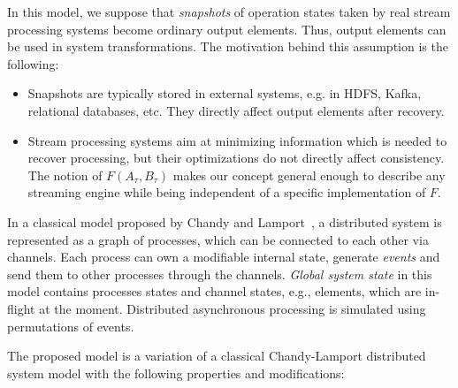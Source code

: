 In this model, we suppose that {\em snapshots} of operation states taken by real stream processing systems become ordinary output elements. Thus, output elements can be used in system transformations. The motivation behind this assumption is the following:

\begin{itemize}
    \item Snapshots are typically stored in external systems, e.g. in HDFS, Kafka, relational databases, etc. They directly affect output elements after recovery.
    \item Stream processing systems aim at minimizing information which is needed to recover processing, but their optimizations do not directly affect consistency. The notion of $F(A_\tau,B_\tau)$ makes our concept general enough to describe any streaming engine while being independent of a specific implementation of $F$.
\end{itemize}

In a classical model proposed by Chandy and Lamport~\cite{Chandy:1985:DSD:214451.214456}, a distributed system is represented as a graph of processes, which can be connected to each other via channels. Each process can own a modifiable internal state, generate {\em events} and send them to other processes through the channels. {\em Global system state} in this model contains processes states and channel states, e.g., elements, which are in-flight at the moment. Distributed asynchronous processing is simulated using permutations of events.

The proposed model is a variation of a classical Chandy-Lamport distributed system model with the following properties and modifications:


